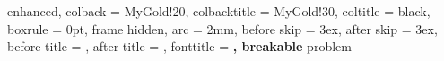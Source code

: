 %
  {enhanced,
   colback        = MyGold!20,
   colbacktitle   = MyGold!30,
   coltitle       = black,
   boxrule        = 0pt,
   frame hidden,
   arc            = 2mm,
   before skip    = 3ex,
   after skip     = 3ex,
   before title   = {\vspace{2mm}},
   after title    = {\vspace{2mm}},
   fonttitle      = \bfseries\sffamily,
   breakable
  }{problem}
